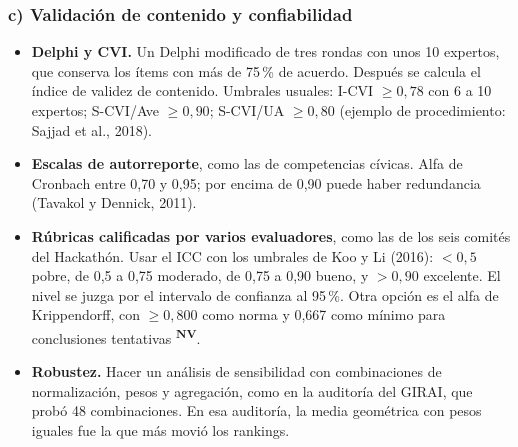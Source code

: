\documentclass[11pt,a4paper]{article}
\newcommand{\nover}{\textsuperscript{\textcolor{aviso}{\textbf{NV}}}}
\begin{document}
\subsubsection*{c) Validación de contenido y confiabilidad}
\begin{itemize}
  \item \textbf{Delphi y CVI.} Un Delphi modificado de tres rondas con unos 10 expertos, que conserva los ítems con más de 75\,\% de acuerdo. Después se calcula el índice de validez de contenido. Umbrales usuales: I-CVI $\geq 0{,}78$ con 6 a 10 expertos; S-CVI/Ave $\geq 0{,}90$; S-CVI/UA $\geq 0{,}80$ (ejemplo de procedimiento: Sajjad et al., 2018).
  \item \textbf{Escalas de autorreporte}, como las de competencias cívicas. Alfa de Cronbach entre 0,70 y 0,95; por encima de 0,90 puede haber redundancia (Tavakol y Dennick, 2011).
  \item \textbf{Rúbricas calificadas por varios evaluadores}, como las de los seis comités del Hackathón. Usar el ICC con los umbrales de Koo y Li (2016): $<0{,}5$ pobre, de 0,5 a 0,75 moderado, de 0,75 a 0,90 bueno, y $>0{,}90$ excelente. El nivel se juzga por el intervalo de confianza al 95\,\%. Otra opción es el alfa de Krippendorff, con $\geq 0{,}800$ como norma y 0,667 como mínimo para conclusiones tentativas \nover.
  \item \textbf{Robustez.} Hacer un análisis de sensibilidad con combinaciones de normalización, pesos y agregación, como en la auditoría del GIRAI, que probó 48 combinaciones. En esa auditoría, la media geométrica con pesos iguales fue la que más movió los rankings.
\end{itemize}
\end{document}
